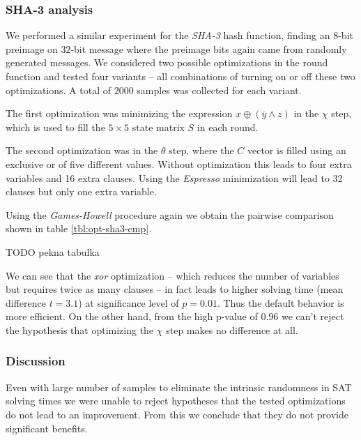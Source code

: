 \subsubsection{SHA-3 analysis} 
We performed a similar experiment for the \emph{SHA-3} hash function, finding an $8$-bit preimage on $32$-bit message where the preimage bits again came from randomly generated messages.
We considered two possible optimizations in the round function and tested four variants -- all combinations of turning on or off these two optimizations.
A total of $2000$ samples was collected for each variant.

The first optimization was minimizing the expression $x \oplus (\overline{y} \land z)$ in the $\chi$ step, which is used to fill the $5\times 5$ state matrix $S$ in each round.

The second optimization was in the $\theta$ step, where the $C$ vector is filled using an exclusive or of five different values.
Without optimization this leads to four extra variables and 16 extra clauses.
Using the \emph{Espresso} minimization will lead to 32 clauses but only one extra variable.

Using the \emph{Games-Howell} procedure again we obtain the pairwise comparison shown in table \ref{tbl:opt-sha3-cmp}.

TODO pekna tabulka

We can see that the \emph{xor} optimization -- which reduces the number of variables but requires twice as many clauses -- in fact leads to higher solving time (mean difference $t=3.1$) at significance level of $p=0.01$.
Thus the default behavior is more efficient.
On the other hand, from the high p-value of $0.96$ we can't reject the hypothesis that optimizing the $\chi$ step makes no difference at all.

%

\subsubsection{Discussion}
Even with large number of samples to eliminate the intrinsic randomness in SAT solving times we were unable to reject hypotheses that the tested optimizations do not lead to an improvement.
From this we conclude that they do not provide significant benefits.

